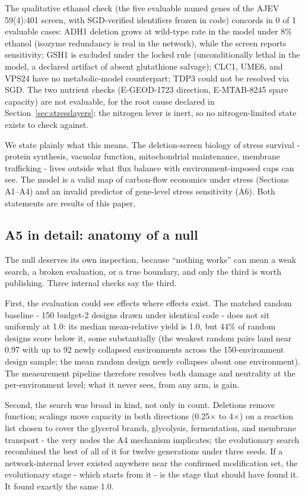 \documentclass[12pt]{article}
\begin{document}
The qualitative ethanol check (the five evaluable named genes of the
AJEV 59(4):401 screen, with SGD-verified identifiers frozen in code)
concords in 0 of 1 evaluable cases: ADH1 deletion grows at wild-type
rate in the model under 8\% ethanol (isozyme redundancy is real in the
network), while the screen reports sensitivity; GSH1 is excluded under
the locked rule (unconditionally lethal in the model, a declared
artifact of absent glutathione salvage); CLC1, UME6, and VPS24 have no
metabolic-model counterpart; TDP3 could not be resolved via SGD. The
two nutrient checks (E-GEOD-1723 direction, E-MTAB-8245 spare capacity)
are not evaluable, for the root cause declared in
Section~\ref{sec:stresslayers}: the nitrogen lever is inert, so no
nitrogen-limited state exists to check against.

We state plainly what this means. The deletion-screen biology of stress
survival - protein synthesis, vacuolar function, mitochondrial
maintenance, membrane trafficking - lives outside what flux balance
with environment-imposed caps can see. The model is a valid map of
carbon-flow economics under stress (Sections A1--A4) and an invalid
predictor of gene-level stress sensitivity (A6). Both statements are
results of this paper.


\subsection{A5 in detail: anatomy of a null}

The null deserves its own inspection, because ``nothing works'' can
mean a weak search, a broken evaluation, or a true boundary, and only
the third is worth publishing. Three internal checks say the third.

First, the evaluation could see effects where effects exist. The
matched random baseline - 150 budget-2 designs drawn under identical
code - does not sit uniformly at 1.0: its median mean-relative yield
is 1.0, but 44\% of random designs score below it, some substantially
(the weakest random pairs land near 0.97 with up to 92 newly collapsed
environments across the 150-environment design sample; the mean random
design newly collapses about one environment). The measurement
pipeline therefore resolves both damage and neutrality at the
per-environment level; what it never sees, from any arm, is gain.

Second, the search was broad in kind, not only in count. Deletions
remove function; scalings move capacity in both directions
(0.25$\times$ to 4$\times$) on a reaction list chosen to cover the
glycerol branch, glycolysis, fermentation, and membrane transport -
the very nodes the A4 mechanism implicates; the evolutionary search
recombined the best of all of it for twelve generations under three
seeds. If a network-internal lever existed anywhere near the confirmed
modification set, the evolutionary stage - which starts from it - is
the stage that should have found it. It found exactly the same 1.0.
\end{document}

